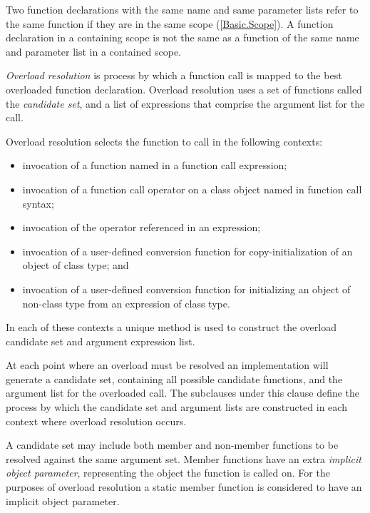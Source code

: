 
\p Two function declarations with the same name and same parameter lists refer to
the same function if they are in the same scope (\ref{Basic.Scope}). A function
declaration in a containing scope is not the same as a function of the same
name and parameter list in a contained scope.


\p \textit{Overload resolution} is process by which a function call is mapped to
the best overloaded function declaration. Overload resolution uses a set of
functions called the \textit{candidate set}, and a list of expressions that
comprise the argument list for the call.

\p Overload resolution selects the function to call in the following
contexts:

\begin{itemize}
  \item invocation of a function named in a function call expression;
  \item invocation of a function call operator on a class object named in
  function call syntax;
  \item invocation of the operator referenced in an expression;
  \item invocation of a user-defined conversion function for copy-initialization
    of an object of class type; and
  \item invocation of a user-defined conversion function for initializing an
    object of non-class type from an expression of class type.
\end{itemize}

\p In each of these contexts a unique method is used to construct the overload
candidate set and argument expression list.


\p At each point where an overload must be resolved an implementation will generate
a candidate set, containing all possible candidate functions, and the argument
list for the overloaded call. The subclauses under this clause
define the process by which the candidate set and argument lists are constructed
in each context where overload resolution occurs.

\p A candidate set may include both member and non-member functions to be resolved
against the same argument set. Member functions have an extra \textit{implicit object
parameter}, representing the object the function is called on. For the purposes
of overload resolution a static member function is considered to have an
implicit object parameter.

